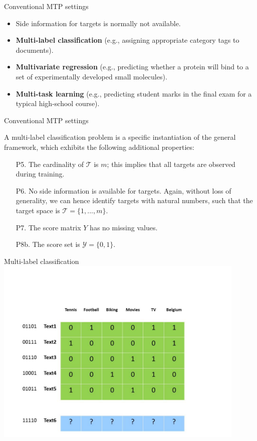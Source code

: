 \documentclass[]{beamer}
\renewcommand{\emph}[1]{\textbf{\color{putblue}#1}}
\begin{document}
\begin{frame}{Conventional MTP settings}
\begin{itemize}
\item Side information for targets is normally not available. 
\item \emph{Multi-label classification} (e.g., assigning appropriate category tags to documents).
\item \emph{Multivariate regression} (e.g., predicting whether a protein will bind to a set of experimentally developed small molecules).
\item \emph{Multi-task learning} (e.g., predicting student marks in the final exam for a typical high-school course).
\end{itemize}
\end{frame}





\begin{frame}{Conventional MTP settings}
\begin{definition} 
A multi-label classification problem is a specific instantiation of the general framework, which exhibits the following additional properties: 
\begin{enumerate}
\item[P5.] The cardinality of $\mathcal{T}$ is $m$; this implies that all targets are observed during training. 
\item[P6.] No side information is available for targets. Again, without loss of generality, we can hence identify targets with natural numbers, such that the target space is $\mathcal{T} = \{1,...,m\}$. 
\item[P7.] The score matrix $Y$ has no missing values. 
\item[P8b.] The score set is $\mathcal{Y} = \{0,1\}$. 
\end{enumerate}
\end{definition}
\end{frame}

\begin{frame}{Multi-label classification}
\includegraphics[width=0.9\textwidth,trim = 0 0 100 100,clip]{Figures/pictures/Slide2}
\end{frame}
\end{document}
